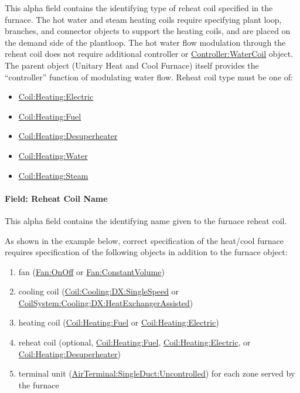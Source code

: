 This alpha field contains the identifying type of reheat coil specified in the furnace. The hot water and steam heating coils require specifying plant loop, branches, and connector objects to support the heating coils, and are placed on the demand side of the plantloop. The hot water flow modulation through the reheat coil does not require additional controller or \hyperref[controllerwatercoil]{Controller:WaterCoil} object. The parent object (Unitary Heat and Cool Furnace) itself provides the ``controller'' function of modulating water flow. Reheat coil type must be one of:

\begin{itemize}
\item
  \hyperref[coilheatingelectric]{Coil:Heating:Electric}
\item
  \hyperref[coilheatinggas-000]{Coil:Heating:Fuel}
\item
  \hyperref[coilheatingdesuperheater]{Coil:Heating:Desuperheater}
\item
  \hyperref[coilheatingwater]{Coil:Heating:Water}
\item
  \hyperref[coilheatingsteam]{Coil:Heating:Steam}
\end{itemize}

\paragraph{Field: Reheat Coil Name}\label{field-reheat-coil-name-000}

This alpha field contains the identifying name given to the furnace reheat coil.

As shown in the example below, correct specification of the heat/cool furnace requires specification of the following objects in addition to the furnace object:

\begin{enumerate}
\def\labelenumi{\arabic{enumi})}
\item
  fan (\hyperref[fanonoff]{Fan:OnOff} or \hyperref[fanconstantvolume]{Fan:ConstantVolume})
\item
  cooling coil (\hyperref[coilcoolingdxsinglespeed]{Coil:Cooling:DX:SingleSpeed} or \hyperref[coilsystemcoolingdxheatexchangerassisted]{CoilSystem:Cooling:DX:HeatExchangerAssisted})
\item
  heating coil (\hyperref[coilheatinggas-000]{Coil:Heating:Fuel} or \hyperref[coilheatingelectric]{Coil:Heating:Electric})
\item
  reheat coil (optional, \hyperref[coilheatinggas-000]{Coil:Heating:Fuel}, \hyperref[coilheatingelectric]{Coil:Heating:Electric}, or \hyperref[coilheatingdesuperheater]{Coil:Heating:Desuperheater})
\item
  terminal unit (\hyperref[airterminalsingleductuncontrolled]{AirTerminal:SingleDuct:Uncontrolled}) for each zone served by the furnace
\end{enumerate}

